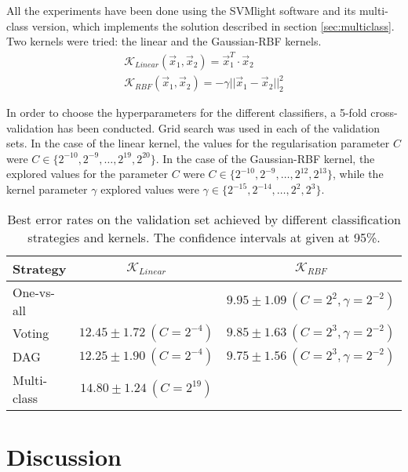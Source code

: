 \documentclass[10pt,a4paper]{article}
\begin{document}
All the experiments have been done using the SVMlight software\cite{joachims1999making} and its multi-class version, which implements the solution described in section \ref{sec:multiclass}. Two kernels were tried: the linear and the Gaussian-RBF kernels.\\

\begin{eqnarray}
\mathcal{K}_{Linear}(\vec{x}_1, \vec{x}_2) = \vec{x}_1^T \cdot \vec{x}_2 \\
\mathcal{K}_{RBF}(\vec{x}_1, \vec{x}_2) = - \gamma ||\vec{x}_1 - \vec{x}_2||_2^2
\end{eqnarray}

In order to choose the hyperparameters for the different classifiers, a 5-fold cross-validation has been conducted. Grid search was used in each of the validation sets. In the case of the linear kernel, the values for the regularisation parameter $C$ were $C \in \{2^{-10}, 2^{-9}, \ldots, 2^{19}, 2^{20} \}$. In the case of the Gaussian-RBF kernel, the explored values for the parameter $C$ were $C \in \{2^{-10}, 2^{-9}, \ldots, 2^{12}, 2^{13}\}$, while the kernel parameter $\gamma$ explored values were $\gamma \in \{2^{-15}, 2^{-14}, \ldots, 2^2, 2^3\}$.

\begin{table}[h]
\centering
\begin{tabular}{|l|c|c|}
\hline
Strategy & $\mathcal{K}_{Linear}$ & $\mathcal{K}_{RBF}$ \\
\hline
One-vs-all & & $9.95 \pm 1.09 ~ (C = 2^2, \gamma=2^{-2})$\\
Voting & $12.45 \pm 1.72 ~ (C = 2^{-4})$ & $9.85 \pm 1.63 ~ (C = 2^3, \gamma = 2^{-2})$  \\
DAG & $12.25 \pm 1.90 ~ (C = 2^{-4})$ & $9.75 \pm 1.56 ~ (C = 2^3, \gamma = 2^{-2})$ \\
Multi-class & $14.80 \pm 1.24 ~ (C = 2^{19})$ & \\
\hline
\end{tabular}
\caption{Best error rates on the validation set achieved by different classification strategies and kernels. The confidence intervals at given at 95\%.}
\label{tab:}
\end{table}

\section{Discussion}



\end{document}

